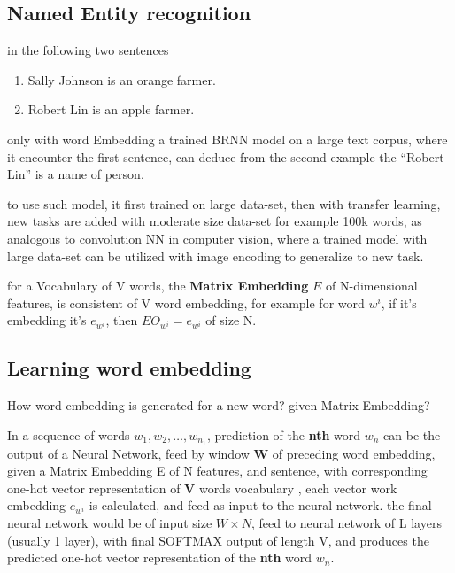 \documentclass[4apaper,12pt]{book}
\begin{document}
\begin{description}
\begin{description}
      \subsection{Named Entity recognition}
      \begin{description}
      \item in the following two sentences \begin{enumerate}
      \item Sally Johnson is an orange farmer.
      \item Robert Lin is an apple farmer.
      \end{enumerate}
      \item only with word Embedding a trained BRNN model on a large text corpus, where it encounter the first sentence, can deduce from the second example the ``Robert Lin'' is a name of person.
      \item to use such model, it first trained on large data-set, then with transfer learning, new tasks are added with moderate size data-set for example 100k words, as analogous to convolution NN in computer vision, where a trained model with large data-set can be utilized with image encoding to generalize to new task.

      \end{description}
      \item for a Vocabulary of V words, the \textbf{Matrix Embedding} $E$ of N-dimensional features, is consistent of V word embedding, for example for word $w^i$, if it's embedding it's $e_{w^i}$, then $EO_{w^i}=e_{w^i}$ of size N.
        \subsection{Learning word embedding}
        \begin{description}
        \item How word embedding is generated for a new word? given Matrix Embedding?
        \item In a sequence of words $w_1,w_2,\dots,w_{n_1}$, prediction of the \textbf{nth} word $w_n$ can be the output of a Neural Network, feed by window \textbf{W} of preceding word embedding, given a Matrix Embedding E of N features, and sentence, with corresponding one-hot vector representation of \textbf{V} words vocabulary  , each vector work embedding $e_{w^i}$ is calculated, and feed as input to the neural network. the final neural network would be of input size $W\times{N}$, feed to neural network of L layers (usually 1 layer), with final SOFTMAX output of length V, and produces the predicted one-hot vector representation of the \textbf{nth} word $w_n$.

\end{description}
\end{description}
\end{description}
\end{document}
